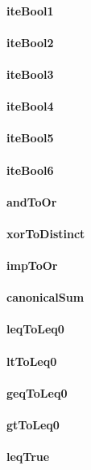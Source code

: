 \documentclass[a4paper]{article}
\begin{document}
\paragraph{iteBool1}
\paragraph{iteBool2}
\paragraph{iteBool3}
\paragraph{iteBool4}
\paragraph{iteBool5}
\paragraph{iteBool6}
\paragraph{andToOr}
\paragraph{xorToDistinct}
\paragraph{impToOr}
\paragraph{canonicalSum}
\paragraph{leqToLeq0}
\paragraph{ltToLeq0}
\paragraph{geqToLeq0}
\paragraph{gtToLeq0}
\paragraph{leqTrue}
\end{document}
